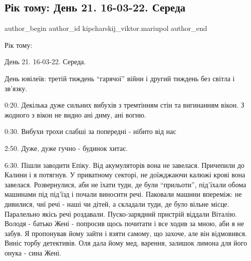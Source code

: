  
 
 
 
 

\subsection{Рік тому: День 21. 16-03-22. Середа}
\label{sec:16_03_2023.fb.kipcharskij_viktor.mariupol.1.r_k_tomu__den_21__16}

\ifcmt
 author_begin
   author_id kipcharskij_viktor.mariupol
 author_end
\fi

Рік тому:

День 21. 16-03-22. Середа.

День ювілеїв: третій тиждень \enquote{гарячої} війни і другий тиждень без світла і
зв'язку.

0:20. Декілька дуже сильних вибухів з тремтінням стін та вигинанням вікон. З
жодного з вікон не видно ані диму, ані вогню. 


0:30. Вибухи трохи слабші за попередні - нібито від нас 

2:50. Дуже, дуже гучно - будинок хитає.

6:30. Пішли заводити Епіку. Від акумуляторів вона не завелася. Причепили до
Калини і я потягнув. У приватному секторі, не доїжджаючи калюжі крові вона
завелася. Розвернулися, аби не їхати туди, де були \enquote{прильоти}, під'їхали обома
машинами під під'їзд і почали виносити речі. Паковали машини впереміж: не
дивилися, чиї речі - наші чи дітей, а складали туди, де було вільне місце.
Паралельно якісь речі роздавали. Пуско-зарядний пристрій віддали Віталію.
Володя - батько Жені - попросив щось почитати і все ходив за мною, аби я не
забув. Я пропонував йому зайти і взяти самому, що захоче, але він відмовився.
Виніс торбу детективів. Оля дала йому мед, варення, залишок лимона для його
онука - сина Жені.

